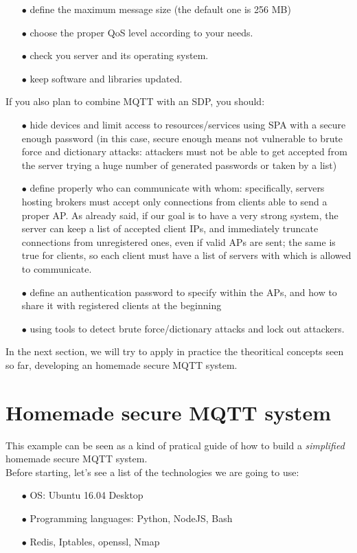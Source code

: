 \documentclass[12pt]{report}
\begin{document}
{{\begin{itemize}
There are many tools to automatize this mechanism, called load balancers and most of them are also able to detect unusually high traffic and block it.
\item[$\bullet$] define the maximum message size (the default one is 256 MB)
\item[$\bullet$] choose the proper QoS level according to your needs.
\item[$\bullet$] check you server and its operating system.
\item[$\bullet$] keep software and libraries updated.\\
\end{itemize}

If you also plan to combine MQTT with an SDP, you should:

\begin{itemize}
\setlength{\itemindent}{+4mm}
\item[$\bullet$] hide devices and limit access to resources/services using SPA with a secure enough password (in this case, secure enough means not vulnerable to brute force and dictionary attacks: attackers must not be able to get accepted from the server trying a huge number of generated passwords or taken by a list)
\item[$\bullet$] define properly who can communicate with whom: specifically, servers hosting brokers must accept only connections from clients able to send a proper AP. As already said, if our goal is to have a very strong system, the server can keep a list of accepted client IPs, and immediately truncate connections from unregistered ones, even if valid APs are sent; the same is true for clients, so each client must have a list of servers with which is allowed to communicate.
\item[$\bullet$] define an authentication password to specify within the APs, and how to share it with registered clients at the beginning
\item[$\bullet$] using tools to detect brute force/dictionary attacks and lock out attackers.
\end{itemize}

In the next section, we will try to apply in practice the theoritical concepts seen so far, developing an homemade secure MQTT system.\\

\section{Homemade secure MQTT system}
\bigskip
This example can be seen as a kind of pratical guide of how to build a \emph{simplified} homemade secure MQTT system.\\
Before starting, let's see a list of the technologies we are going to use:
\bigskip
\begin{itemize}
\setlength{\itemindent}{+4mm}
\item[$\bullet$] OS: Ubuntu 16.04 Desktop
\item[$\bullet$] Programming languages: Python, NodeJS, Bash
\item[$\bullet$] Redis, Iptables, openssl, Nmap\\
\end{itemize}

}}
\end{document}
